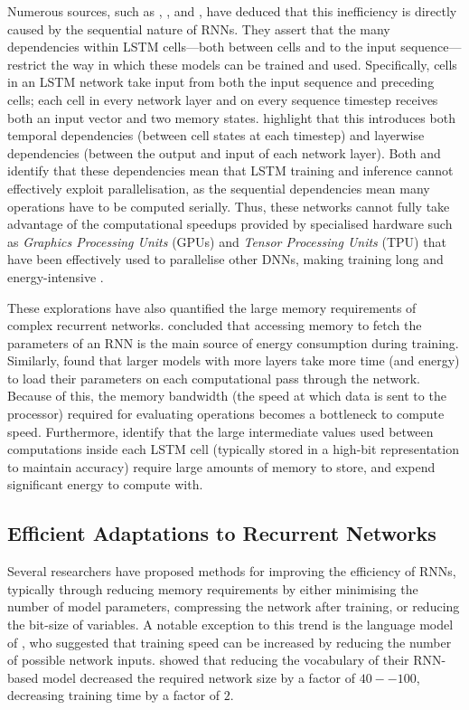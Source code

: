 \documentclass[a4paper, 11pt]{report}
\begin{document}
    Numerous sources, such as \citet{cao-2017}, \citet{feliz-2021}, and \citet{zhang-2021}, have deduced that this inefficiency is directly caused by the sequential nature of RNNs. They assert that the many dependencies within LSTM cells---both between cells and to the input sequence---restrict the way in which these models can be trained and used. Specifically, cells in an LSTM network take input from both the input sequence and preceding cells; each cell in every network layer and on every sequence timestep receives both an input vector and two memory states. \citet{cao-2017} highlight that this introduces both temporal dependencies (between cell states at each timestep) and layerwise dependencies (between the output and input of each network layer). Both \citet{cao-2017} and \citet{feliz-2021} identify that these dependencies mean that LSTM training and inference cannot effectively exploit parallelisation, as the sequential dependencies mean many operations have to be computed serially. Thus, these networks cannot fully take advantage of the computational speedups provided by specialised hardware such as \emph{Graphics Processing Units} (GPUs) and \emph{Tensor Processing Units} (TPU) that have been effectively used to parallelise other DNNs, making training long and energy-intensive \citep{zhang-2021b}.

    These explorations have also quantified the large memory requirements of complex recurrent networks. \citet{feliz-2021} concluded that accessing memory to fetch the parameters of an RNN is the main source of energy consumption during training. Similarly, \citet{cao-2017} found that larger models with more layers take more time (and energy) to load their parameters on each computational pass through the network. Because of this, the memory bandwidth (the speed at which data is sent to the processor) required for evaluating operations becomes a bottleneck to compute speed. Furthermore, \citet{zhang-2021} identify that the large intermediate values used between computations inside each LSTM cell (typically stored in a high-bit representation to maintain accuracy) require large amounts of memory to store, and expend significant energy to compute with.


    \subsection{Efficient Adaptations to Recurrent Networks}

    Several researchers have proposed methods for improving the efficiency of RNNs, typically through reducing memory requirements by either minimising the number of model parameters, compressing the network after training, or reducing the bit-size of variables. A notable exception to this trend is the language model of \citet{li-2016}, who suggested that training speed can be increased by reducing the number of possible network inputs. \citet{li-2016} showed that reducing the vocabulary of their RNN-based model decreased the required network size by a factor of $40--100$, decreasing training time by a factor of $2$. 
\end{document}
